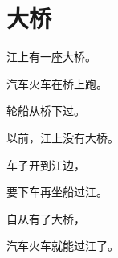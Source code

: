 \documentclass[12pt,UTF-8,openany]{ctexbook}
\begin{document}
\clearpage

\begin{center}
    
\end{center}


\hanzibox{}\hanzibox{}\hanzibox{}\hanzibox{}\hspace{1em}\hanzibox{}\hanzibox{}\hanzibox{}\hanzibox{}

\hanzibox{}\hanzibox{}\hanzibox{}\hanzibox{}\hspace{1em}\hanzibox{}\hanzibox{}\hanzibox{}\hanzibox{}

\hanzibox{}\hanzibox{}\hanzibox{}\hanzibox{}\hspace{1em}\hanzibox{}\hanzibox{}\hanzibox{}\hanzibox{}

\hanzibox{}\hanzibox{}\hanzibox{}\hanzibox{}\hspace{1em}




\chapter{大桥}

\begin{large}
    
    江上有一座大桥。
    
    汽车火车在桥上跑。
    
    轮船从桥下过。
    
    以前，江上没有大桥。
    
    车子开到江边，
    
    要下车再坐船过江。
    
    自从有了大桥，
    
    汽车火车就能过江了。
    
\end{large}


\clearpage

\begin{center}
    
\end{center}


\hanzibox{}\hanzibox{}\hanzibox{}\hanzibox{}\hspace{1em}\hanzibox{}\hanzibox{}\hanzibox{}\hanzibox{}
\end{document}
